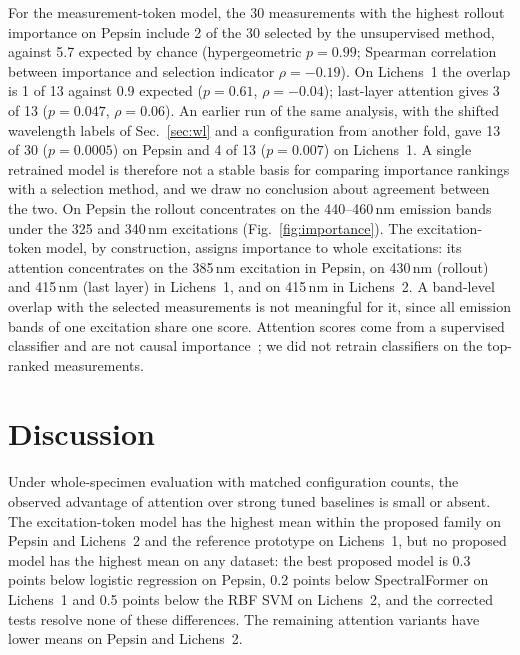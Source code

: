 \documentclass[journal]{IEEEtran}
\begin{document}
For the measurement-token model, the 30 measurements with the highest rollout importance on Pepsin include 2 of the 30 selected by the unsupervised method, against 5.7 expected by chance (hypergeometric $p=0.99$; Spearman correlation between importance and selection indicator $\rho=-0.19$). On Lichens~1 the overlap is 1 of 13 against 0.9 expected ($p=0.61$, $\rho=-0.04$); last-layer attention gives 3 of 13 ($p=0.047$, $\rho=0.06$). An earlier run of the same analysis, with the shifted wavelength labels of Sec.~\ref{sec:wl} and a configuration from another fold, gave 13 of 30 ($p=0.0005$) on Pepsin and 4 of 13 ($p=0.007$) on Lichens~1. A single retrained model is therefore not a stable basis for comparing importance rankings with a selection method, and we draw no conclusion about agreement between the two. On Pepsin the rollout concentrates on the 440--460\,nm emission bands under the 325 and 340\,nm excitations (Fig.~\ref{fig:importance}). The excitation-token model, by construction, assigns importance to whole excitations: its attention concentrates on the 385\,nm excitation in Pepsin, on 430\,nm (rollout) and 415\,nm (last layer) in Lichens~1, and on 415\,nm in Lichens~2. A band-level overlap with the selected measurements is not meaningful for it, since all emission bands of one excitation share one score. Attention scores come from a supervised classifier and are not causal importance~\cite{jain2019notexpl}; we did not retrain classifiers on the top-ranked measurements.

\section{Discussion}
Under whole-specimen evaluation with matched configuration counts, the observed advantage of attention over strong tuned baselines is small or absent. The excitation-token model has the highest mean within the proposed family on Pepsin and Lichens~2 and the reference prototype on Lichens~1, but no proposed model has the highest mean on any dataset: the best proposed model is 0.3 points below logistic regression on Pepsin, 0.2 points below SpectralFormer on Lichens~1 and 0.5 points below the RBF SVM on Lichens~2, and the corrected tests resolve none of these differences. The remaining attention variants have lower means on Pepsin and Lichens~2.
\end{document}
